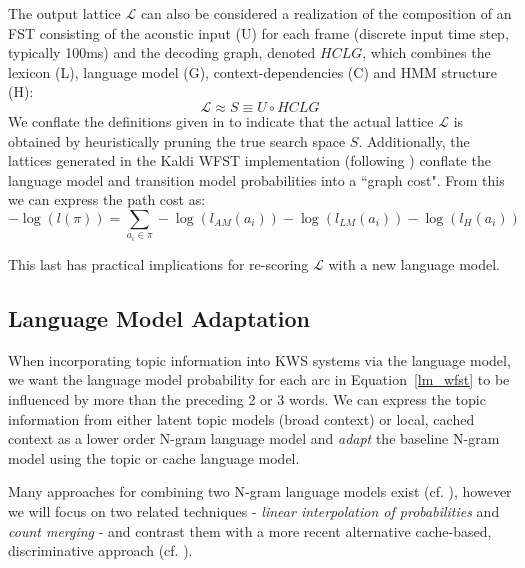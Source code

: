 The output lattice $\mathcal{L}$ can also be considered a realization of the composition of an FST consisting of the acoustic input (U) for each frame (discrete input time step, typically 100ms) and the decoding graph, denoted $HCLG$, which combines the lexicon (L), language model (G), context-dependencies (C) and HMM structure (H)\cite{povey2012}:
\begin{equation}
\mathcal{L} \approx S \equiv U \circ HCLG
\end{equation}
\noindent We conflate the definitions given in \cite{povey2012} to indicate that the actual lattice $\mathcal{L}$ is obtained by heuristically pruning the true search space $S$.  Additionally, the lattices generated in the Kaldi WFST implementation (following \cite{povey2012}) conflate the language model and transition model probabilities into a ``graph cost".  From this we can express the path cost as:
\begin{equation}
-\log(l(\pi)) = \sum_{a_i \in \pi} -\log(l_{AM}(a_i)) - \log(l_{LM}(a_i)) - \log(l_{H}(a_i))\label{lm_wfst}
\end{equation}

\noindent This last has practical implications for re-scoring $\mathcal{L}$ with a new language model.  

\subsection{Language Model Adaptation}
When incorporating topic information into KWS systems via the language model, we want the language model probability for each arc in Equation~\ref{lm_wfst} to be influenced by more than the preceding 2 or 3 words.  We can express the topic information from either latent topic models (broad context) or local, cached context as a lower order N-gram language model and \textit{adapt} the baseline N-gram model using the topic or cache language model.  

Many approaches for combining two N-gram language models exist (cf. \cite{bellegarda2004}), however we will focus on two related techniques - \textit{linear interpolation of probabilities} and \textit{count merging} - and contrast them with a more recent alternative cache-based, discriminative approach (cf. \cite{roark2004discriminative,singh2007trigger}).

